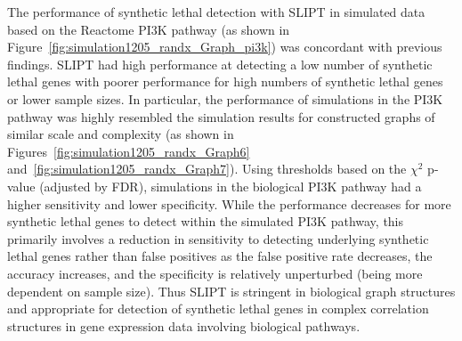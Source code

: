 The performance of \gls{synthetic lethal} detection with \gls{SLIPT} in simulated  data based on the Reactome \gls{PI3K} pathway (as shown in Figure~\ref{fig:simulation1205_randx_Graph_pi3k}) was concordant with previous findings. \gls{SLIPT} had high performance at detecting a low number of \gls{synthetic lethal} genes with poorer performance for high numbers of \gls{synthetic lethal} genes or lower sample sizes. In particular, the performance of simulations in the \gls{PI3K} pathway was highly resembled the simulation results for constructed \glspl{graph} of similar scale and complexity (as shown in Figures~\ref{fig:simulation1205_randx_Graph6} and~\ref{fig:simulation1205_randx_Graph7}). Using thresholds based on the $\chi^2$ p-value (adjusted by \gls{FDR}), simulations in the biological \gls{PI3K} pathway had a higher sensitivity and lower specificity. While the performance decreases for more \gls{synthetic lethal} genes to detect within the simulated \gls{PI3K} pathway, this primarily involves a reduction in sensitivity to detecting underlying \gls{synthetic lethal} genes rather than false positives as the false positive rate decreases, the accuracy increases, and the specificity is relatively unperturbed (being more dependent on sample size). Thus \gls{SLIPT} is stringent in biological \gls{graph} structures and appropriate for detection of \gls{synthetic lethal} genes in complex correlation structures in \gls{gene expression} data involving biological pathways. 

